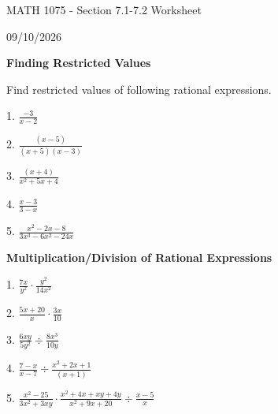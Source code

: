 \documentclass[12pt]{article}
\begin{document}
\vspace*{0.5in}

\begin{center}
    {\LARGE MATH 1075 - Section 7.1-7.2 Worksheet}

    \vspace{2em}

    {\large 09/10/2026}
\end{center}

\vspace{2em}

\textbf{\large Finding Restricted Values}

\vspace{1.5em}
Find restricted values of following rational expressions.
\vspace{1.5em}

1. $\frac{-3}{x-2} $

\vspace{4.5em}

2. $\frac{(x-5)}{(x+5)(x-3)} $

\vspace{4.5em}

3. $\frac{(x+4)}{x^{2}+5x+4} $

\vspace{4.5em}

4. $\frac{x-3}{3-x} $

\vspace{4.5em}

5. $\frac{x^{2}-2x-8}{3x^{3}-6x^{2}-24x} $

\newpage

\textbf{\large Multiplication/Division of Rational Expressions}

\vspace{1.5em}

1. $\frac{7x}{y^{2}}\cdot \frac{y^{2}}{14x^{2}}  $

\vspace{4.5em}
2. $\frac{5x+20}{x}\cdot \frac{3x}{10}  $

\vspace{4.5em}
3. $\frac{6xy}{5y^{2}}\div \frac{8x^{3}}{10y}  $

\vspace{4.5em}
4. $\frac{7-x}{x-7}\div \frac{x^{2}+2x+1}{(x+1)}  $

\vspace{4.5em}
5. $\frac{x^{2}-25}{3x^{2}+3xy}\cdot \frac{x^{2}+4x+xy+4y}{x^{2}+9x+20}\div \frac{x-5}{x}   $

\vspace{4.5em}
\end{document}
